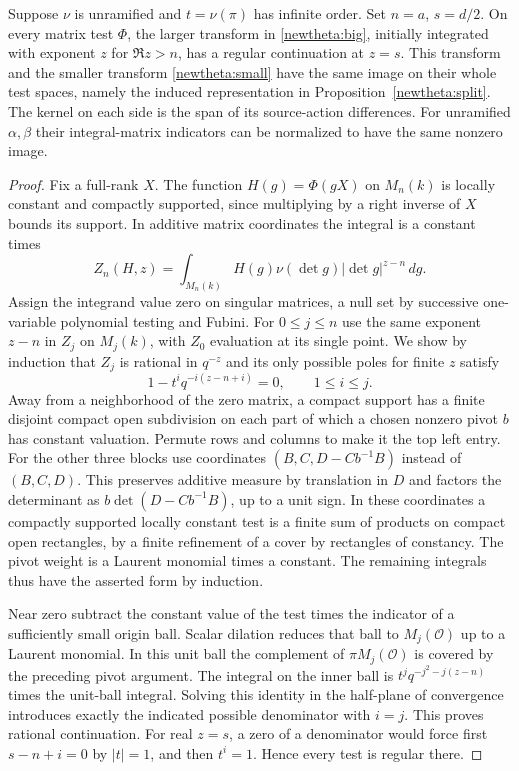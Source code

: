 \begin{proposition}
\label{split:good}
Suppose \(\nu\) is unramified and \(t=\nu(\pi)\) has infinite order.
Set \(n=a\), \(s=d/2\). On every matrix test \(\Phi\), the larger
transform in \eqref{newtheta:big}, initially integrated with exponent
\(z\) for \(\Re z>n\), has a regular continuation at \(z=s\).
This transform and the smaller transform \eqref{newtheta:small}
have the same image on their whole test spaces, namely the induced
representation in Proposition~\ref{newtheta:split}. The kernel on
each side is the span of its source-action differences. For
unramified \(\alpha,\beta\) their integral-matrix indicators can be
normalized to have the same nonzero image.
\end{proposition}
\begin{proof}
Fix a full-rank \(X\). The function \(H(g)=\Phi(gX)\) on \(M_n(k)\)
is locally constant and compactly supported, since multiplying by a
right inverse of \(X\) bounds its support. In additive matrix
coordinates the integral is a constant times
\[
 Z_n(H,z)=\int_{M_n(k)} H(g)\nu(\det g)|\det g|^{z-n}\,dg .
\]
Assign the integrand value zero on singular matrices, a null set
by successive one-variable polynomial testing and Fubini.
For \(0\le j\le n\) use the same exponent \(z-n\) in \(Z_j\) on
\(M_j(k)\), with \(Z_0\) evaluation at its single point.
We show by induction that \(Z_j\) is rational in \(q^{-z}\) and
its only possible poles for finite \(z\) satisfy
\[
           1-t^i q^{-i(z-n+i)}=0,\qquad 1\le i\le j .
\]
Away from a neighborhood of the zero matrix, a compact support has
a finite disjoint compact open subdivision on each part of which a
chosen nonzero pivot \(b\) has constant valuation. Permute rows and
columns to make it the top left entry. For the other three blocks use
coordinates \((B,C,D-Cb^{-1}B)\) instead of \((B,C,D)\). This
preserves additive measure by translation in \(D\) and factors the
determinant as \(b\det(D-Cb^{-1}B)\), up to a unit sign.
In these coordinates a compactly supported locally constant test is
a finite sum of products on compact open rectangles, by a finite
refinement of a cover by rectangles of constancy. The pivot weight
is a Laurent monomial times a constant. The remaining integrals thus
have the asserted form by induction.

Near zero subtract the constant value of the test times the
indicator of a sufficiently small origin ball. Scalar dilation
reduces that ball to \(M_j(\mathcal O)\) up to a Laurent monomial.
In this unit ball the complement of \(\pi M_j(\mathcal O)\) is
covered by the preceding pivot argument. The integral on the
inner ball is \(t^j q^{-j^2-j(z-n)}\) times the unit-ball integral.
Solving this identity in the half-plane of convergence introduces
exactly the indicated possible denominator with \(i=j\). This
proves rational continuation. For real \(z=s\), a zero of a
denominator would force first \(s-n+i=0\) by \(|t|=1\), and then
\(t^i=1\). Hence every test is regular there.


\end{proof}
